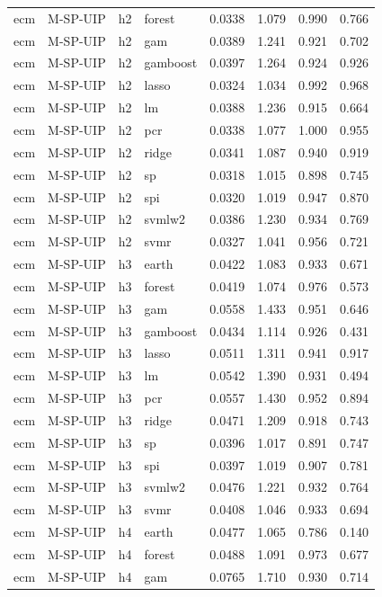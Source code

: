 \begin{ThreePartTable}
\begin{longtable}[t]{llclcccc}
ecm & M-SP-UIP & h2 & forest & 0.0338 & 1.079 & 0.990 & 0.766\\
ecm & M-SP-UIP & h2 & gam & 0.0389 & 1.241 & 0.921 & 0.702\\
ecm & M-SP-UIP & h2 & gamboost & 0.0397 & 1.264 & 0.924 & 0.926\\
ecm & M-SP-UIP & h2 & lasso & 0.0324 & 1.034 & 0.992 & 0.968\\
ecm & M-SP-UIP & h2 & lm & 0.0388 & 1.236 & 0.915 & 0.664\\
ecm & M-SP-UIP & h2 & pcr & 0.0338 & 1.077 & 1.000 & 0.955\\
ecm & M-SP-UIP & h2 & ridge & 0.0341 & 1.087 & 0.940 & 0.919\\
ecm & M-SP-UIP & h2 & sp & 0.0318 & 1.015 & 0.898 & 0.745\\
ecm & M-SP-UIP & h2 & spi & 0.0320 & 1.019 & 0.947 & 0.870\\
ecm & M-SP-UIP & h2 & svmlw2 & 0.0386 & 1.230 & 0.934 & 0.769\\
ecm & M-SP-UIP & h2 & svmr & 0.0327 & 1.041 & 0.956 & 0.721\\
\addlinespace
ecm & M-SP-UIP & h3 & earth & 0.0422 & 1.083 & 0.933 & 0.671\\
ecm & M-SP-UIP & h3 & forest & 0.0419 & 1.074 & 0.976 & 0.573\\
ecm & M-SP-UIP & h3 & gam & 0.0558 & 1.433 & 0.951 & 0.646\\
ecm & M-SP-UIP & h3 & gamboost & 0.0434 & 1.114 & 0.926 & 0.431\\
ecm & M-SP-UIP & h3 & lasso & 0.0511 & 1.311 & 0.941 & 0.917\\
ecm & M-SP-UIP & h3 & lm & 0.0542 & 1.390 & 0.931 & 0.494\\
ecm & M-SP-UIP & h3 & pcr & 0.0557 & 1.430 & 0.952 & 0.894\\
ecm & M-SP-UIP & h3 & ridge & 0.0471 & 1.209 & 0.918 & 0.743\\
ecm & M-SP-UIP & h3 & sp & 0.0396 & 1.017 & 0.891 & 0.747\\
ecm & M-SP-UIP & h3 & spi & 0.0397 & 1.019 & 0.907 & 0.781\\
ecm & M-SP-UIP & h3 & svmlw2 & 0.0476 & 1.221 & 0.932 & 0.764\\
ecm & M-SP-UIP & h3 & svmr & 0.0408 & 1.046 & 0.933 & 0.694\\
\addlinespace
ecm & M-SP-UIP & h4 & earth & 0.0477 & 1.065 & 0.786 & 0.140\\
ecm & M-SP-UIP & h4 & forest & 0.0488 & 1.091 & 0.973 & 0.677\\
ecm & M-SP-UIP & h4 & gam & 0.0765 & 1.710 & 0.930 & 0.714\\

\end{longtable}
\end{ThreePartTable}
